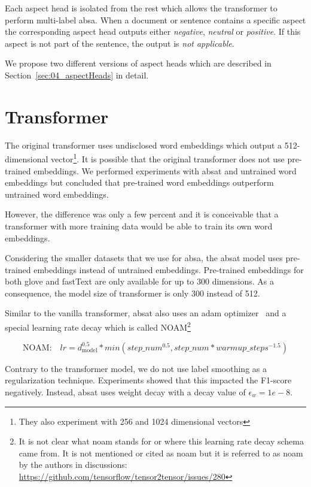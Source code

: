 Each aspect head is isolated from the rest which allows the transformer to perform multi-label \gls{absa}. When a document or sentence contains a specific aspect the corresponding aspect head outputs either \textit{negative}, \textit{neutral} or \textit{positive}. If this aspect is not part of the sentence, the output is \textit{not applicable}.

We propose two different versions of aspect heads which are described in Section~\ref{sec:04_aspectHeads} in detail.

\section{Transformer}
\label{sec:04_transformer}

The original transformer uses undisclosed word embeddings which output a 512-dimensional vector\footnote{They also experiment with 256 and 1024 dimensional vectors}. It is possible that the original transformer does not use pre-trained embeddings. We performed experiments with \gls{absat} and untrained word embeddings but concluded that pre-trained word embeddings outperform untrained word embeddings. 

However, the difference was only a few percent and it is conceivable that a transformer with more training data would be able to train its own word embeddings.
\medskip

Considering the smaller datasets that we use for \gls{absa}, the \gls{absat} model uses pre-trained embeddings instead of untrained embeddings. Pre-trained embeddings for both \gls{glove} and fastText are only available for up to 300 dimensions. As a consequence, the model size of transformer is only 300 instead of 512.
\bigskip

Similar to the vanilla transformer, \gls{absat} also uses an \gls{adam} optimizer~\cite{Kingma2014} and a special learning rate decay which is called NOAM\footnote{It is not clear what noam stands for or where this learning rate decay schema came from. It is not mentioned or cited as noam but it is referred to as noam by the authors in discussions: \url{https://github.com/tensorflow/tensor2tensor/issues/280}}~\cite{Vaswani2017}

\begin{equation}
	\text{NOAM:} \quad lr = d_\text{model}^{0.5} * min(step\_num^{0.5}, step\_num*warmup\_steps^{-1.5})
\end{equation}
 
Contrary to the transformer model, we do not use label smoothing as a regularization technique. Experiments showed that this impacted the F1-score negatively. Instead, \gls{absat} uses weight decay with a decay value of $\epsilon_w = 1e-8$.



